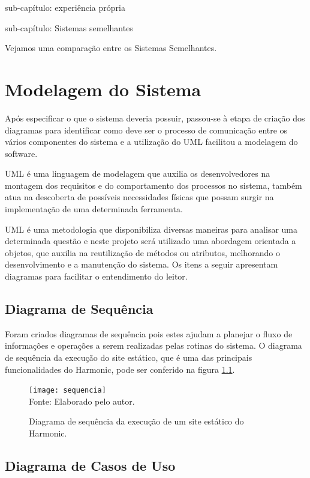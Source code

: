 \documentclass[ppginf, pep]{esinucpel}
\begin{document}
sub-capítulo: experiência própria

sub-capítulo: Sistemas semelhantes

Vejamos uma comparação entre os Sistemas Semelhantes.

\chapter{Modelagem do Sistema}

Após especificar o que o sistema deveria possuir, passou-se à etapa de criação dos diagramas para identificar como deve ser o processo de comunicação entre os vários componentes do sistema e a utilização do UML facilitou a modelagem do software.

UML é uma linguagem de modelagem que auxilia os desenvolvedores na montagem dos requisitos e do comportamento dos processos no sistema, também atua na descoberta de possíveis necessidades físicas que possam surgir na implementação de uma determinada ferramenta. \cite{uml}

UML é uma metodologia que disponibiliza diversas maneiras para analisar uma determinada questão e neste projeto será utilizado uma abordagem orientada a objetos, que auxilia na reutilização de métodos ou atributos, melhorando o desenvolvimento e a manutenção do sistema. Os itens a seguir apresentam diagramas para facilitar o entendimento do leitor.

\section{Diagrama de Sequência}

Foram criados diagramas de sequência pois estes ajudam a planejar o fluxo de informações e operações a serem realizadas pelas rotinas do sistema. O diagrama de sequência da execução do site estático, que é uma das principais funcionalidades do Harmonic, pode ser conferido na figura \ref{fig:sequencia}.

\begin{figure}[H]
    \centering
    \caption{Diagrama de sequência da execução de um site estático do Harmonic.}
    \vspace{5pt}
    \texttt{[image: sequencia]}
    \\Fonte: Elaborado pelo autor.
    \label{fig:sequencia}
\end{figure}

\section{Diagrama de Casos de Uso}
\end{document}
